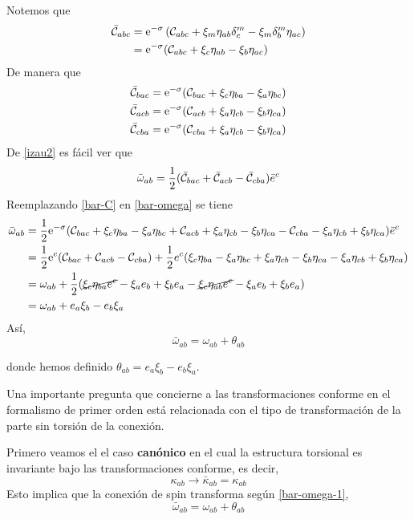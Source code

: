 Notemos que
\begin{align}
  \bar{\mathcal{C}}_{abc}&=\mathrm{e}^{-\sigma}\left(\mathcal{C}_{abc}+\xi_m\eta_{ab}\delta^m_c-\xi_m\delta^m_b\eta_{ac}\right)\\
  &=\mathrm{e}^{-\sigma}(\mathcal{C}_{abc}+\xi_c\eta_{ab}-\xi_b\eta_{ac})
\end{align}
De manera que
\begin{subequations}\label{bar-C}
\begin{align}
  \bar{\mathcal{C}}_{bac}&=\mathrm{e}^{-\sigma}(\mathcal{C}_{bac}+\xi_c\eta_{ba}-\xi_a\eta_{bc})\\
  \bar{\mathcal{C}}_{acb}&=\mathrm{e}^{-\sigma}(\mathcal{C}_{acb}+\xi_a\eta_{cb}-\xi_b\eta_{ca})\\
  \bar{\mathcal{C}}_{cba}&=\mathrm{e}^{-\sigma}(\mathcal{C}_{cba}+\xi_a\eta_{cb}-\xi_b\eta_{ca})
\end{align}
\end{subequations}
De \eqref{izau2} es fácil ver que
\begin{equation}\label{bar-omega}
	\bar{\omega}_{ab}=\frac{1}{2}(\bar{\mathcal{C}}_{bac}+\bar{\mathcal{C}}_{acb}-\bar{\mathcal{C}}_{cba})\bar{e}^c
\end{equation}
Reemplazando \eqref{bar-C} en \eqref{bar-omega} se tiene
\begin{align}
  \bar{\omega}_{ab}&=\frac{1}{2}\mathrm{e}^{-\sigma}(\mathcal{C}_{bac}+\xi_c\eta_{ba}-\xi_a\eta_{bc}+\mathcal{C}_{acb}+\xi_a\eta_{cb}-\xi_b\eta_{ca}-\mathcal{C}_{cba}-\xi_a\eta_{cb}+\xi_b\eta_{ca})\bar{e}^c\\
  &=\frac{1}{2}\mathrm{e}^c(\mathcal{C}_{bac}+\mathcal{C}_{acb}-\mathcal{C}_{cba})+\frac{1}{2}e^c(\xi_c\eta_{ba}-\xi_a\eta_{bc}+\xi_a\eta_{cb}-\xi_b\eta_{ca}-\xi_a\eta_{cb}+\xi_b\eta_{ca})\\
  &=\omega_{ab}+\frac{1}{2}(\cancel{\xi_c\eta_{ba}e^c}-\xi_ae_b+\xi_be_a-\cancel{\xi_c\eta_{ab}e^c}-\xi_ae_b+\xi_be_a)\\
  &=\omega_{ab}+e_a\xi_b-e_b\xi_a
\end{align}
Así,
\begin{equation}\label{bar-omega-1}
  \bar{\omega}_{ab}=\omega_{ab}+\theta_{ab}
\end{equation}

donde hemos definido $\theta_{ab}=e_a\xi_b-e_b\xi_a$.

Una importante pregunta que concierne a las transformaciones conforme en el formalismo de primer orden está relacionada con el tipo de transformación de la parte sin torsión de la conexión. 

Primero veamos el el caso \textbf{canónico} en el cual la estructura torsional es invariante bajo las transformaciones conforme, es decir,
\begin{equation}
  \kappa_{ab}\to \bar{\kappa}_{ab}=\kappa_{ab}
\end{equation}
Esto implica que la conexión de spin transforma según \eqref{bar-omega-1},
\begin{equation}
  \bar{\omega}_{ab}=\omega_{ab}+\theta_{ab}
\end{equation}

